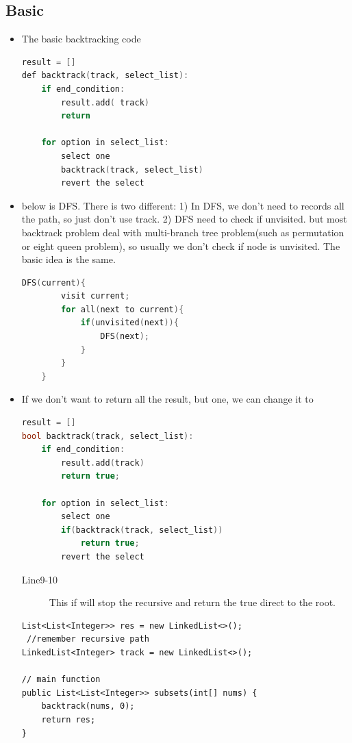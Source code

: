 \documentclass[a4paper,11pt,twoside]{book}
\begin{document}
\subsection{Basic}
\begin{itemize}
	
	\item The basic backtracking code
\begin{lstlisting}[frame=single, language=c++]
result = []
def backtrack(track, select_list):
	if end_condition:
		result.add( track)
		return

	for option in select_list:
		select one
		backtrack(track, select_list)
		revert the select	
\end{lstlisting}

\item below is DFS. There is two different: 1) In DFS, we don't need to records all the path, so just don't use track. 2) DFS need to check if unvisited. but most backtrack problem deal with multi-branch tree problem(such as permutation or eight queen problem), so usually we don't check if node is unvisited. The basic idea is the same. 
\begin{lstlisting}[frame=single, language=c++]
	DFS(current){
		visit current;
		for all(next to current){
			if(unvisited(next)){
				DFS(next);
			}
		}
	}
\end{lstlisting} 


	\item If we don't want to return all the result, but one, we can change it to 
\begin{lstlisting}[frame=single, language=c++]
result = []
bool backtrack(track, select_list):
	if end_condition:
		result.add(track)
		return true;
	
	for option in select_list:
		select one
		if(backtrack(track, select_list))
			return true;
		revert the select	
\end{lstlisting}
\begin{description}
	\item[Line9-10] This if will stop the recursive and return the true direct to the root.
\end{description}


\begin{lstlisting}
List<List<Integer>> res = new LinkedList<>();
 //remember recursive path
LinkedList<Integer> track = new LinkedList<>();

// main function
public List<List<Integer>> subsets(int[] nums) {
	backtrack(nums, 0);
	return res;
}



\end{lstlisting}
\end{itemize}
\end{document}
